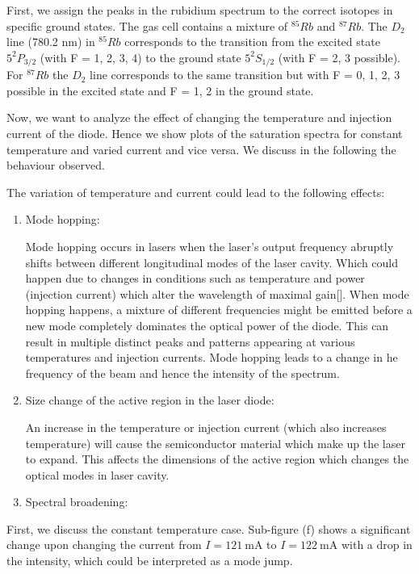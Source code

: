 \documentclass{article}
\begin{document}
First, we assign the peaks in the rubidium spectrum to the correct isotopes in specific ground states. The gas cell contains a mixture of $^{85}Rb$ and $^{87}Rb$. The $D_2$ line (780.2 nm) in $^{85}Rb$ corresponds to the transition from the excited state $5^2P_{3/2}$ (with F = 1, 2, 3, 4) to the ground state $5^2S_{1/2}$ (with F = 2, 3 possible). For $^{87}Rb$ the $D_2$ line corresponds to the same transition but with F = 0, 1, 2, 3 possible in the excited state and F = 1, 2 in the ground state.

Now, we want to analyze the effect of changing the temperature and injection current of the diode. Hence we show plots of the saturation spectra for constant temperature and varied current and vice versa. We discuss in the following the behaviour observed. 

The variation of temperature and current could lead to the following effects: 

\begin{enumerate}
\item Mode hopping:

Mode hopping occurs in lasers when the laser's output frequency abruptly shifts between different longitudinal modes of the laser cavity. Which could happen due to changes in conditions such as temperature and power (injection current) which alter the wavelength of maximal gain[]. When mode hopping happens, a mixture of different frequencies might be emitted before a new mode completely dominates the optical power of the diode. This can result in multiple distinct peaks and patterns appearing at various temperatures and injection currents. Mode hopping leads to a change in he frequency of the beam and hence the intensity of the spectrum. 

\item Size change of the active region in the laser diode: 

An increase in the temperature or injection current (which also increases temperature) will cause the semiconductor material which make up the laser to expand. This affects the dimensions of the active region which changes the optical modes in laser cavity.

\item Spectral broadening: 
\end{enumerate}

First, we discuss the constant temperature case. Sub-figure (f) shows a significant change upon changing the current from $I = \SI{121}{\mA}$ to $I = \SI{122}{\mA}$ with a drop in the intensity, which could be interpreted as a mode jump. 
\end{document}
